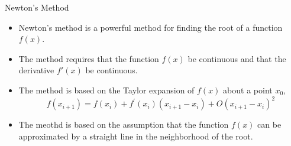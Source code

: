 \documentclass{beamer}
\begin{document}
\begin{frame}{Newton's Method}
\begin{itemize} 
  \item Newton's method is a powerful method for finding the root of a function $f(x)$.
  \item  The method requires that the function $f(x)$ be continuous and that the derivative $f'(x)$ be continuous.
  \item   The method is based on the Taylor expansion of $f(x)$ about a point $x_0$,
  \[
    f\left(x_{i+1}\right)=f\left(x_i\right)+f^{\prime}\left(x_i\right)\left(x_{i+1}-x_i\right)+O\left(x_{i+1}-x_i\right)^2
  \]
  \item The meothd is based on the assumption that the function $f(x)$ can be approximated by a straight line in the neighborhood of the root.
  \end{itemize}
\end{frame}
\end{document}
